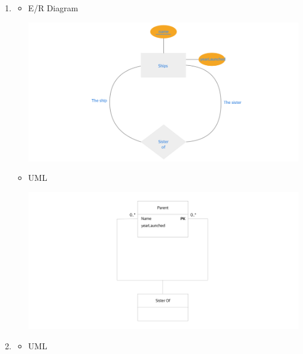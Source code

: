 \documentclass[12pt]{article}
\begin{document}
\begin{enumerate}[1.]
    \item

    \begin{itemize}
        \item E/R Diagram

        \begin{center}
        \includegraphics[width=\linewidth]{images/worksheet_15_solution_21.png}
        \end{center}

        \item UML

        \begin{center}
        \includegraphics[width=\linewidth]{images/worksheet_15_solution_22.png}
        \end{center}

    \end{itemize}

    \item

    \begin{itemize}

        \item UML


\end{itemize}
\end{enumerate}
\end{document}
